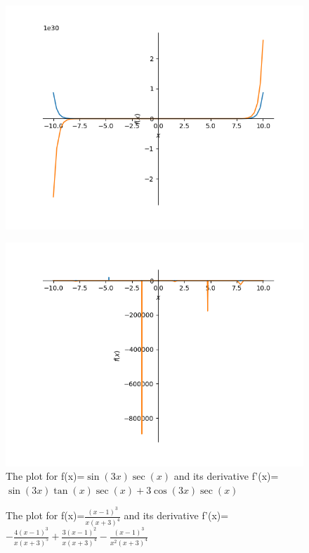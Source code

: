 \documentclass{article}
\begin{document}
\begin{figure}
\includegraphics{plot_36}
\end{figure}\begin{figure}
\caption{The plot for f(x)=$\sin{\left(3 x \right)} \sec{\left(x \right)}$ and its derivative f'(x)=$\sin{\left(3 x \right)} \tan{\left(x \right)} \sec{\left(x \right)} + 3 \cos{\left(3 x \right)} \sec{\left(x \right)}$}
\centering
\includegraphics{plot_37}
\end{figure}\begin{figure}
\caption{The plot for f(x)=$\frac{\left(x - 1\right)^{3}}{x \left(x + 3\right)^{4}}$ and its derivative f'(x)=$- \frac{4 \left(x - 1\right)^{3}}{x \left(x + 3\right)^{5}} + \frac{3 \left(x - 1\right)^{2}}{x \left(x + 3\right)^{4}} - \frac{\left(x - 1\right)^{3}}{x^{2} \left(x + 3\right)^{4}}$}

\end{figure}
\end{document}
